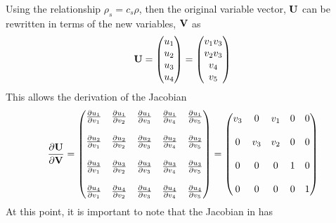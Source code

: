 Using the relationship $\rho_s = c_s \rho$, then the original variable vector,
$\mathbf U$ can be rewritten in terms of the new variables, $\mathbf V$ as
\begin{equation}
  \mathbf U = \begin{pmatrix}
    u_1 \\
    u_2 \\
    u_3 \\
    u_4
  \end{pmatrix}
  =
  \begin{pmatrix}
    v_1 v_3 \\
    v_2 v_3 \\
    v_4 \\
    v_5
  \end{pmatrix}
  \label{u-to-v}
\end{equation}
This allows the derivation of the Jacobian 
\begin{equation}
  \frac{\partial \mathbf U}{\partial \mathbf V} = 
  \begin{pmatrix}
    \frac{\partial u_1}{\partial v_1} & \frac{\partial u_1}{\partial v_2} & \frac{\partial u_1}{\partial v_3} & \frac{\partial u_1}{\partial v_4} & \frac{\partial u_1}{\partial v_5} \\ \\
    \frac{\partial u_2}{\partial v_1} & \frac{\partial u_2}{\partial v_2} & \frac{\partial u_2}{\partial v_3} & \frac{\partial u_2}{\partial v_4} & \frac{\partial u_2}{\partial v_5} \\ \\
    \frac{\partial u_3}{\partial v_1} & \frac{\partial u_3}{\partial v_2} & \frac{\partial u_3}{\partial v_3} & \frac{\partial u_3}{\partial v_4} & \frac{\partial u_3}{\partial v_5} \\ \\
    \frac{\partial u_4}{\partial v_1} & \frac{\partial u_4}{\partial v_2} & \frac{\partial u_4}{\partial v_3} & \frac{\partial u_4}{\partial v_4} & \frac{\partial u_4}{\partial v_5}
  \end{pmatrix}
  =
  \begin{pmatrix}
    v_3 & 0   & v_1 & 0 & 0 \\ \\
    0   & v_3 & v_2 & 0 & 0 \\ \\
    0   & 0   & 0   & 1 & 0 \\ \\
    0   & 0   & 0   & 0 & 1
  \end{pmatrix}
  \label{dudv-jac}
\end{equation}
At this point, it is important to note that the Jacobian in  has
